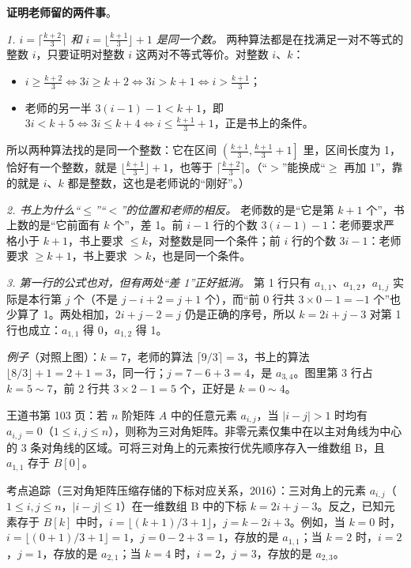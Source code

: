 \documentclass[10.5pt,a4paper,oneside]{article}
\providecommand{\tightlist}{\setlength{\itemsep}{2pt}\setlength{\parskip}{0pt}}
\begin{document}
\begin{addbox}

\textbf{证明老师留的两件事}。

\emph{1. \(i = \lceil \frac{k+2}{3} \rceil\) 和
\(i = \lfloor \frac{k+1}{3} \rfloor + 1\) 是同一个数。}
两种算法都是在找满足一对不等式的整数 \(i\)，只要证明对整数 \(i\)
这两对不等式等价。对整数 \(i\)、\(k\)：

\begin{itemize}
\tightlist
\item
  \(i \ge \frac{k+2}{3} \iff 3i \ge k+2 \iff 3i > k+1 \iff i > \frac{k+1}{3}\)；
\item
  老师的另一半 \(3(i-1)-1 < k+1\)，即
  \(3i < k+5 \iff 3i \le k+4 \iff i \le \frac{k+1}{3}+1\)，正是书上的条件。
\end{itemize}

所以两种算法找的是同一个整数：它在区间
\(\left(\frac{k+1}{3}, \frac{k+1}{3}+1\right]\) 里，区间长度为
1，恰好有一个整数，就是 \(\lfloor \frac{k+1}{3} \rfloor + 1\)，也等于
\(\lceil \frac{k+2}{3} \rceil\)。（“\(>\)”能换成“\(\ge\) 再加
1”，靠的就是 \(i\)、\(k\) 都是整数，这也是老师说的“刚好”。）

\emph{2. 书上为什么“\(\le\)”“\(<\)”的位置和老师的相反。}
老师数的是“它是第 \(k+1\) 个”，书上数的是“它前面有 \(k\) 个”，差 1。前
\(i-1\) 行的个数 \(3(i-1)-1\)：老师要求严格小于 \(k+1\)，书上要求
\(\le k\)，对整数是同一个条件；前 \(i\) 行的个数 \(3i-1\)：老师要求
\(\ge k+1\)，书上要求 \(> k\)，也是同一个条件。

\emph{3. 第一行的公式也对，但有两处“差 1”正好抵消。} 第 1 行只有
\(a_{1,1}\)、\(a_{1,2}\)，\(a_{1,j}\) 实际是本行第 \(j\) 个（不是
\(j - i + 2 = j+1\) 个），而“前 0 行共 \(3\times0-1 = -1\) 个”也少算了
1。两处相加，\(2i+j-2 = j\) 仍是正确的序号，所以 \(k = 2i+j-3\) 对第 1
行也成立：\(a_{1,1}\) 得 0，\(a_{1,2}\) 得 1。

\emph{例子}（对照上图）：\(k = 7\)，老师的算法
\(\lceil 9/3 \rceil = 3\)，书上的算法
\(\lfloor 8/3 \rfloor + 1 = 2 + 1 = 3\)，同一行；\(j = 7 - 6 + 3 = 4\)，是
\(a_{3,4}\)。图里第 3 行占 \(k = 5\sim7\)，前 2 行共 \(3\times2-1 = 5\)
个，正好是 \(k=0\sim4\)。

\end{addbox}

\begin{bookbox}

王道书第 103 页：若 \(n\) 阶矩阵 \(A\) 中的任意元素 \(a_{i,j}\)，当
\(|i-j| > 1\) 时均有
\(a_{i,j} = 0\)（\(1 \le i, j \le n\)），则称为三对角矩阵。非零元素仅集中在以主对角线为中心的
3 条对角线的区域。可将三对角上的元素按行优先顺序存入一维数组 B，且
\(a_{1,1}\) 存于 \(B[0]\)。

考点追踪（三对角矩阵压缩存储的下标对应关系，2016）：三对角上的元素
\(a_{i,j}\)（\(1 \le i, j \le n\)，\(|i-j| \le 1\)）在一维数组 B
中的下标 \(k = 2i+j-3\)。反之，已知元素存于 \(B[k]\)
中时，\(i = \lfloor (k+1)/3 + 1 \rfloor\)，\(j = k - 2i + 3\)。例如，当
\(k = 0\)
时，\(i = \lfloor (0+1)/3 + 1 \rfloor = 1\)，\(j = 0 - 2 + 3 = 1\)，存放的是
\(a_{1,1}\)；当 \(k = 2\) 时，\(i = 2\)，\(j = 1\)，存放的是
\(a_{2,1}\)；当 \(k = 4\) 时，\(i = 2\)，\(j = 3\)，存放的是
\(a_{2,3}\)。

\end{bookbox}
\end{document}
